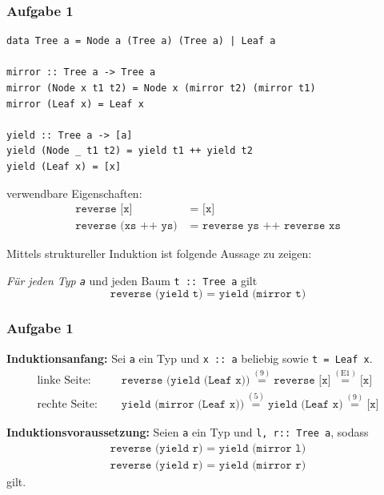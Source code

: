 \documentclass{beamer}
\newcommand{\step}[2][]{\ensuremath{\overset{{#1} (\text{#2})}{=}}}
\begin{document}
\begin{frame}[fragile] \frametitle{Aufgabe 1}
	\footnotesize
	\begin{lstlisting}[style=bg, basicstyle=\ttfamily\scriptsize]
data Tree a = Node a (Tree a) (Tree a) | Leaf a

mirror :: Tree a -> Tree a
mirror (Node x t1 t2) = Node x (mirror t2) (mirror t1)
mirror (Leaf x) = Leaf x

yield :: Tree a -> [a]
yield (Node _ t1 t2) = yield t1 ++ yield t2
yield (Leaf x) = [x]
	\end{lstlisting}
	verwendbare Eigenschaften:
	\begin{align*}
		\texttt{reverse [x]} &\texttt{ = }  \texttt{[x]} \tag{E1} \\
		\texttt{reverse (xs ++ ys)} &\texttt{ = } \texttt{reverse ys ++ reverse xs} \tag{E2}
	\end{align*}

	Mittels struktureller Induktion ist folgende Aussage zu zeigen:
	\begin{tcolorbox}[colback=cddarkblue!10, boxrule=0pt, arc=0mm]
		\textit{Für jeden Typ \texttt{a}} und jeden Baum \texttt{t :: Tree a} gilt 
		\begin{equation*}
			\texttt{reverse (yield t) = yield (mirror t)} 
		\end{equation*}
	\end{tcolorbox}
\end{frame}
	
\begin{frame} \frametitle{Aufgabe 1}
	\scriptsize
	\textbf{Induktionsanfang:} Sei \texttt{a} ein Typ und \texttt{x :: a} beliebig sowie \texttt{t = Leaf x}. 
	\begin{align*}
			\text{linke Seite: } \quad &\texttt{reverse (yield (Leaf x))} \step{9} \texttt{reverse [x]} \step{E1} \texttt{[x]} \\
			\text{rechte Seite: } \quad & \texttt{yield (mirror (Leaf x))} \step{5} \texttt{yield (Leaf x)} \step{9} \texttt{[x]}
		\end{align*}
	
	\textbf{Induktionsvoraussetzung:} Seien \texttt{a} ein Typ und \texttt{l, r:: Tree a}, sodass
	\begin{align}
			\texttt{reverse (yield r) = yield (mirror l)}  \tag{IV1} \\
			\texttt{reverse (yield r) = yield (mirror r)}  \tag{IV2}
	\end{align}
	gilt.
\end{frame}
\end{document}
